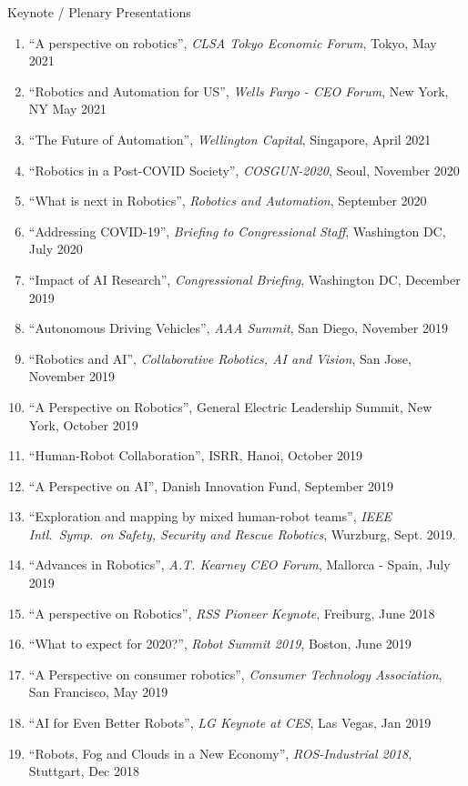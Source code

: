 \documentclass{article}
\begin{document}
\begin{cv}
\begin{cvlist}{Keynote / Plenary Presentations}
\begin{enumerate}
{          Workshop on Robot Systems for Unstructured Environments}, June  2021
  \item ``A perspective on robotics'', {\em CLSA Tokyo Economic Forum}, Tokyo, May 2021
  \item ``Robotics and Automation for US'', {\em Wells Fargo - CEO Forum}, New York, NY May 2021
  \item ``The Future of Automation'', {\em Wellington Capital}, Singapore, April 2021
  \item ``Robotics in a Post-COVID Society'', {\em COSGUN-2020}, Seoul, November 2020
  \item ``What is next in Robotics'', {\em Robotics and Automation}, September 2020
  \item ``Addressing COVID-19'', {\em Briefing to Congressional Staff}, Washington DC, July 2020
  \item ``Impact of AI Research'', {\em Congressional Briefing}, Washington DC, December 2019
  \item ``Autonomous Driving Vehicles'', {\em AAA Summit}, San Diego, November 2019
  \item ``Robotics and AI'', {\em Collaborative Robotics, AI and Vision}, San Jose, November 2019
  \item ``A Perspective on Robotics'', General Electric Leadership Summit, New York, October 2019
  \item ``Human-Robot Collaboration'', ISRR, Hanoi, October 2019
  \item ``A Perspective on AI'', Danish Innovation Fund, September 2019
  \item ``Exploration and mapping by mixed human-robot teams'', {\em
      IEEE Intl.\ Symp.\ on Safety, Security and Rescue Robotics}, Wurzburg, Sept. 2019.
  \item  ``Advances in Robotics'', {\em A.T. Kearney CEO Forum}, Mallorca - Spain, July 2019
  \item ``A perspective on Robotics'', {\em RSS Pioneer Keynote}, Freiburg, June 2018
  \item ``What to expect for 2020?'', {\em Robot Summit 2019}, Boston, June 2019
  \item ``A Perspective on consumer robotics'', {\em Consumer Technology Association}, San Francisco, May 2019
  \item ``AI for Even Better Robots'', {\em LG Keynote at CES}, Las Vegas, Jan 2019
  \item ``Robots, Fog and Clouds in a New Economy'', {\em ROS-Industrial 2018}, Stuttgart, Dec 2018

\end{enumerate}
\end{cvlist}
\end{cv}
\end{document}
